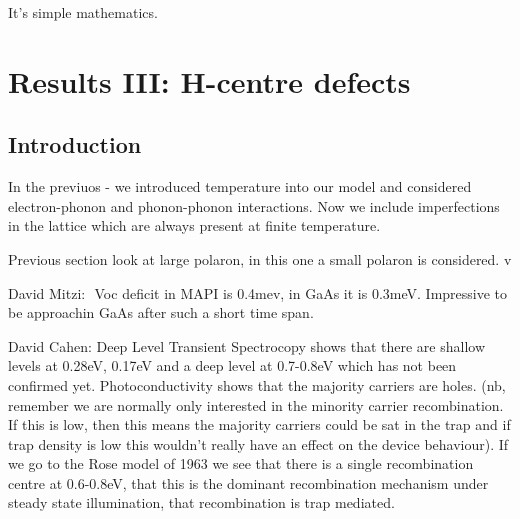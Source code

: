 \begin{savequote}[8cm]
It's simple mathematics.
\end{savequote}

\chapter{\label{ch:6-defects}Results III: H-centre defects}

\section{Introduction}
In the previuos - we introduced temperature into our model and considered electron-phonon and phonon-phonon interactions. Now we include imperfections in the lattice which are always present at finite temperature.

Previous section look at large polaron, in this one a small polaron is considered.
 v

David Mitzi: 
Voc deficit in MAPI is 0.4mev, in GaAs it is 0.3meV. Impressive to be approachin GaAs after such a short time span.


David Cahen: Deep Level Transient Spectrocopy shows that there are shallow levels at 0.28eV, 0.17eV and a deep level at 0.7-0.8eV which has not been confirmed yet.
Photoconductivity shows that the majority carriers are holes. (nb, remember we are normally only interested in the minority carrier recombination. If this is low, then this means the majority carriers could be sat in the trap and if trap density is low this wouldn’t really have an effect on the device behaviour).
If we go to the Rose model of 1963 we see that there is a single recombination centre at 0.6-0.8eV, that this is the dominant recombination mechanism under steady state illumination, that recombination is trap mediated. 

